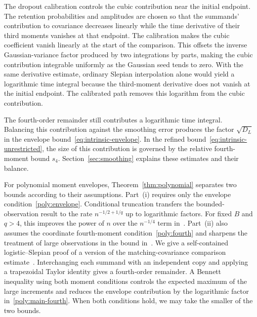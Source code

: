 \documentclass[11pt,letterpaper]{article}
\theoremstyle{remark}
\begin{document}
The dropout calibration controls the cubic contribution near the
initial endpoint. The retention probabilities and amplitudes are
chosen so that the summands' contribution to covariance decreases
linearly while the time derivative of their third moments vanishes
at that endpoint. The calibration makes the cubic coefficient vanish linearly
at the start of the comparison. This offsets the inverse
Gaussian-variance factor produced by two integrations by parts,
making the cubic contribution integrable uniformly as the Gaussian
seed tends to zero. With the same derivative estimate, ordinary
Slepian interpolation alone would yield a logarithmic time integral
because the third-moment derivative does not vanish at the initial
endpoint. The calibrated path removes this logarithm from the cubic
contribution.

The fourth-order remainder still contributes a logarithmic time
integral. Balancing this contribution against the smoothing error
produces the factor \(\sqrt{D_L}\) in the envelope
bound~\eqref{eq:intrinsic-envelope}. In the refined
bound~\eqref{eq:intrinsic-unrestricted}, the size of this contribution
is governed by the relative fourth-moment bound \(s_4\).
Section~\ref{sec:smoothing} explains these estimates and their balance.

For polynomial moment envelopes, Theorem~\ref{thm:polynomial}
separates two bounds according to their assumptions.
Part~\textup{(i)} requires only the envelope
condition~\eqref{poly:envelope}. Conditional truncation transfers
the bounded-observation result to the rate \(n^{-1/2+1/q}\) up to
logarithmic factors. For fixed \(B\) and \(q>4\), this improves
the power of \(n\) over the \(n^{-1/4}\) term
in~\cite[Theorem~2.5]{CCKK2022}. Part~\textup{(ii)} also assumes
the coordinate fourth-moment condition~\eqref{poly:fourth} and
sharpens the treatment of large observations in the bound
in~\cite{CCKK2022}. We give a self-contained logistic--Slepian
proof of a version of the matching-covariance comparison
estimate~\cite[Lemma~A.1]{CCKK2022}. Interchanging each summand
with an independent copy and applying a trapezoidal Taylor identity
gives a fourth-order remainder. A Bennett inequality using both
moment conditions controls the expected maximum of the large
increments and reduces the envelope contribution by the logarithmic
factor in~\eqref{poly:main-fourth}. When both conditions hold,
we may take the smaller of the two bounds.
\end{document}
